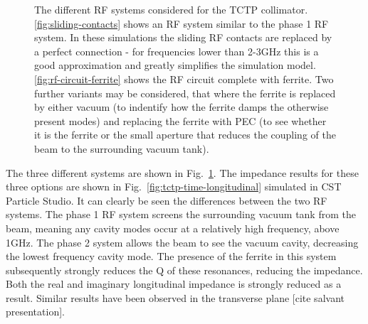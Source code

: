 \begin{figure}
\begin{center}
\end{center}
\label{fig:rf-systems-tctp}
\caption{The different RF systems considered for the TCTP collimator. \ref{fig:sliding-contacts} shows an RF system similar to the phase 1 RF system. In these simulations the sliding RF contacts are replaced by a perfect connection - for frequencies lower than 2-3GHz this is a good approximation and greatly simplifies the simulation model. \ref{fig:rf-circuit-ferrite} shows the RF circuit complete with ferrite. Two further variants may be considered, that where the ferrite is replaced by either vacuum (to indentify how the ferrite damps the otherwise present modes) and replacing the ferrite with PEC (to see whether it is the ferrite or the small aperture that reduces the coupling of the beam to the surrounding vacuum tank).}
\end{figure}


The three different systems are shown in Fig.~\ref{fig:rf-systems-tctp}. The impedance results for these three options are shown in Fig.~\ref{fig:tctp-time-longitudinal} simulated in CST Particle Studio. It can clearly be seen the differences between the two RF systems. The phase 1 RF system screens the surrounding vacuum tank from the beam, meaning any cavity modes occur at a relatively high frequency, above 1GHz. The phase 2 system allows the beam to see the vacuum cavity, decreasing the lowest frequency cavity mode. The presence of the ferrite in this system subsequently strongly reduces the Q of these resonances, reducing the impedance. Both the real and imaginary longitudinal impedance is strongly reduced as a result. Similar results have been observed in the transverse plane [cite salvant presentation].


